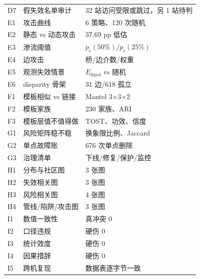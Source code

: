 \begin{longtable}{@{}p{}p{}p{}@{}}
\unit{D7} & 假失效名单审计 & 32 站访问受限或跳过，另 1 站待判 \\
\unit{E1} & 攻击曲线 & 6 策略、120 次随机 \\
\unit{E2} & 静态 vs 动态攻击 & 37.69 pp 低估 \\
\unit{E3} & 渗流阈值 & \(p_c(50\%)/p_c(25\%)\) \\
\unit{E4} & 边攻击 & 桥/边介数/权重 \\
\unit{E5} & 观测失效情景 & \(E_{\mathrm{fixed}}\) vs 随机 \\
\unit{E6} & disparity 骨架 & 31 边/618 孤立 \\
\unit{F1} & 模板相似 vs 链接 & Mantel 3×3×2 \\
\unit{F2} & 模板家族 & 230 家族、ARI \\
\unit{F3} & 模板层值不值得做 & TOST、功效、信度 \\
\unit{G1} & 风险矩阵稳不稳 & 换象限比例、Jaccard \\
\unit{G2} & 单点故障账 & 676 次单点删除 \\
\unit{G3} & 治理清单 & 下线/修复/保护/监控 \\
\unit{H1} & 分布与社区图 & 3 张图 \\
\unit{H2} & 失效相关图 & 3 张图 \\
\unit{H3} & 风险相关图 & 4 张图 \\
\unit{H4} & 管线/陷阱/攻击图 & 3 张图 \\
\unit{I1} & 数值一致性 & 真冲突 0 \\
\unit{I2} & 口径违规 & 硬伤 0 \\
\unit{I3} & 统计效度 & 硬伤 0 \\
\unit{I4} & 因果措辞 & 硬伤 0 \\
\unit{I5} & 跨机复现 & 数据表逐字节一致 \\

\end{longtable}
